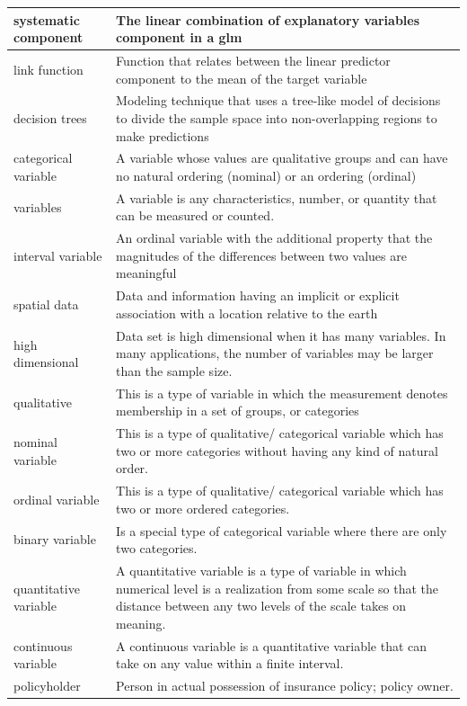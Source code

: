 \documentclass[
]{book}
\begin{document}
\begin{longtable}{>{\raggedright\arraybackslash}p{10em}|>{\raggedright\arraybackslash}p{30em}}
\hline
systematic component & The linear combination of explanatory variables component in a glm\\
\hline
link function & Function that relates between the linear predictor component to the mean of the target variable\\
\hline
decision trees & Modeling technique that uses a tree-like model of decisions to divide the sample space into non-overlapping regions to make predictions\\
\hline
categorical variable & A variable whose values are qualitative groups and can have no natural ordering (nominal) or an ordering (ordinal)\\
\hline
variables & A variable is any characteristics, number, or quantity that can be measured or counted.\\
\hline
interval variable & An ordinal variable with the additional property that the magnitudes of the differences between two values are meaningful\\
\hline
spatial data & Data and information having an implicit or explicit association with a location relative to the earth\\
\hline
high dimensional & Data set is high dimensional when it has many variables. In many applications, the number of variables may be larger than the sample size.\\
\hline
qualitative & This is a type of variable in which the measurement denotes membership in a set of groups, or categories\\
\hline
nominal variable & This is a type of qualitative/ categorical variable which has two or more categories without having any kind of natural order.\\
\hline
ordinal variable & This is a type of qualitative/ categorical variable which has two or more ordered categories.\\
\hline
binary variable & Is a special type of categorical variable where there are only two categories.\\
\hline
quantitative variable & A quantitative variable is a type of variable in which numerical level is a realization from some scale so that the distance between any two levels of the scale takes on meaning.\\
\hline
continuous variable & A continuous variable is a quantitative variable that can take on any value within a finite interval.\\
\hline
policyholder & Person in actual possession of insurance policy; policy owner.\\

\end{longtable}
\end{document}
